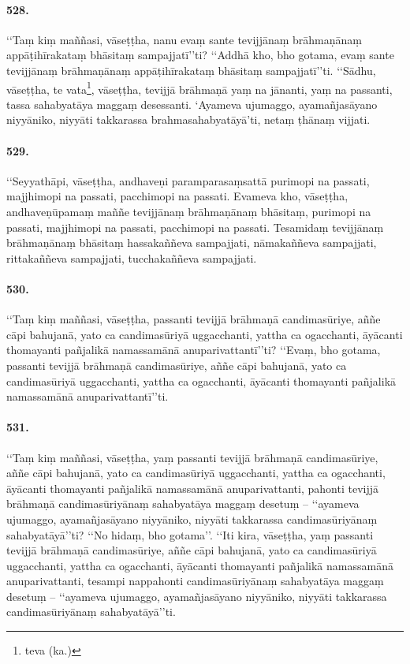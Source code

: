 \paragraph{528.} ‘‘Taṃ kiṃ maññasi, vāseṭṭha, nanu evaṃ sante tevijjānaṃ brāhmaṇānaṃ appāṭihīrakataṃ bhāsitaṃ sampajjatī’’ti? ‘‘Addhā kho, bho gotama, evaṃ sante tevijjānaṃ brāhmaṇānaṃ appāṭihīrakataṃ bhāsitaṃ sampajjatī’’ti. ‘‘Sādhu, vāseṭṭha, te vata\footnote{teva (ka.)}, vāseṭṭha, tevijjā brāhmaṇā yaṃ na jānanti, yaṃ na passanti, tassa sahabyatāya maggaṃ desessanti. ‘Ayameva ujumaggo, ayamañjasāyano niyyāniko, niyyāti takkarassa brahmasahabyatāyā’ti, netaṃ ṭhānaṃ vijjati.

\paragraph{529.} ‘‘Seyyathāpi, vāseṭṭha, andhaveṇi paramparasaṃsattā purimopi na passati, majjhimopi na passati, pacchimopi na passati. Evameva kho, vāseṭṭha, andhaveṇūpamaṃ maññe tevijjānaṃ brāhmaṇānaṃ bhāsitaṃ, purimopi na passati, majjhimopi na passati, pacchimopi na passati. Tesamidaṃ tevijjānaṃ brāhmaṇānaṃ bhāsitaṃ hassakaññeva sampajjati, nāmakaññeva sampajjati, rittakaññeva sampajjati, tucchakaññeva sampajjati.

\paragraph{530.} ‘‘Taṃ kiṃ maññasi, vāseṭṭha, passanti tevijjā brāhmaṇā candimasūriye, aññe cāpi bahujanā, yato ca candimasūriyā uggacchanti, yattha ca ogacchanti, āyācanti thomayanti pañjalikā namassamānā anuparivattantī’’ti? ‘‘Evaṃ, bho gotama, passanti tevijjā brāhmaṇā candimasūriye, aññe cāpi bahujanā, yato ca candimasūriyā uggacchanti, yattha ca ogacchanti, āyācanti thomayanti pañjalikā namassamānā anuparivattantī’’ti.

\paragraph{531.} ‘‘Taṃ kiṃ maññasi, vāseṭṭha, yaṃ passanti tevijjā brāhmaṇā candimasūriye, aññe cāpi bahujanā, yato ca candimasūriyā uggacchanti, yattha ca ogacchanti, āyācanti thomayanti pañjalikā namassamānā anuparivattanti, pahonti tevijjā brāhmaṇā candimasūriyānaṃ sahabyatāya maggaṃ desetuṃ – ‘‘ayameva ujumaggo, ayamañjasāyano niyyāniko, niyyāti takkarassa candimasūriyānaṃ sahabyatāyā’’ti? ‘‘No hidaṃ, bho gotama’’. ‘‘Iti kira, vāseṭṭha, yaṃ passanti tevijjā brāhmaṇā candimasūriye, aññe cāpi bahujanā, yato ca candimasūriyā uggacchanti, yattha ca ogacchanti, āyācanti thomayanti pañjalikā namassamānā anuparivattanti, tesampi nappahonti candimasūriyānaṃ sahabyatāya maggaṃ desetuṃ – ‘‘ayameva ujumaggo, ayamañjasāyano niyyāniko, niyyāti takkarassa candimasūriyānaṃ sahabyatāyā’’ti.

